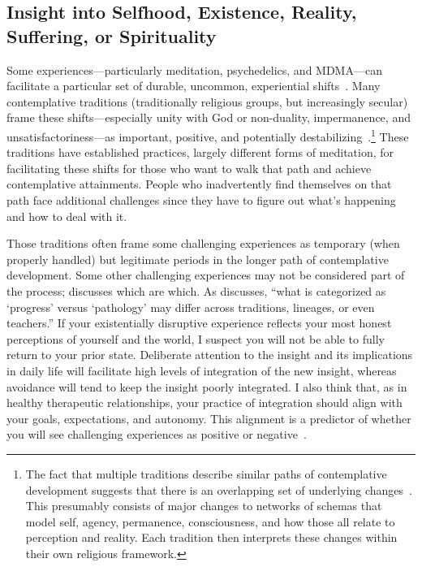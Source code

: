 \documentclass[11pt,oneside]{book}
\let\cite\parencite
\newcommand{\writtenByDay}[1]{#1}
\begin{document}
\subsection{Insight into Selfhood, Existence, Reality, Suffering, or Spirituality}
\label{selfinsight}
Some experiences---particularly meditation, psychedelics, and MDMA---can facilitate a particular set of durable, uncommon, experiential shifts~\cite{ingramMDMA,ingram2018mastering}. Many contemplative traditions (traditionally religious groups, but increasingly secular) frame these shifts---especially unity with God or non-duality, impermanence, and unsatisfactoriness---as important, positive, and potentially destabilizing~\cite{ingram2018mastering}.\footnote{The fact that multiple traditions describe similar paths of contemplative development suggests that there is an overlapping set of underlying changes~\cite{ingram2018mastering}. This presumably consists of major changes to networks of schemas that model self, agency, permanence, consciousness, and how those all relate to perception and reality. Each tradition then interprets these changes within their own religious framework.} These traditions have established practices, largely different forms of meditation, for facilitating these shifts for those who want to walk that path and achieve contemplative attainments. People who inadvertently find themselves on that path face additional challenges since they have to figure out what's happening and how to deal with it.

Those traditions often frame some challenging experiences as temporary (when properly handled) but legitimate periods in the longer path of contemplative development. Some other challenging experiences may not be considered part of the process; \textcite{lindahlDifferential} discusses which are which. As \textcite[p. 25]{lindahl2017varieties} discusses, \enquote{what is categorized as \enquote{progress} versus \enquote{pathology} may differ across traditions, lineages, or even teachers.} \writtenByDay{If your existentially disruptive experience reflects your most honest perceptions of yourself and the world, I suspect you will not be able to fully return to your prior state.} Deliberate attention to the insight and its implications in daily life will facilitate high levels of integration of the new insight, whereas avoidance will tend to keep the insight poorly integrated. \writtenByDay{I also think that, as in healthy therapeutic relationships, your practice of integration should align with your goals, expectations, and autonomy.} This alignment is a predictor of whether you will see challenging experiences as positive or negative~\cite{lindahl2017varieties}.
\end{document}
